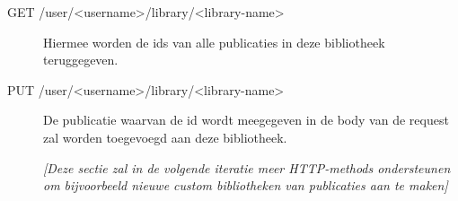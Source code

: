 \documentclass{article}
\begin{document}
\begin{description}

\item[GET /user/<username>/library/<library-name>] Hiermee worden de ids van alle publicaties in deze bibliotheek teruggegeven.

\item[PUT /user/<username>/library/<library-name>] De publicatie waarvan de id wordt meegegeven in de body van de request zal worden toegevoegd aan deze bibliotheek.

\textit{[Deze sectie zal in de volgende iteratie meer HTTP-methods ondersteunen om bijvoorbeeld nieuwe custom bibliotheken van publicaties aan te maken]}

\end{description}

\clearpage




\end{document}
